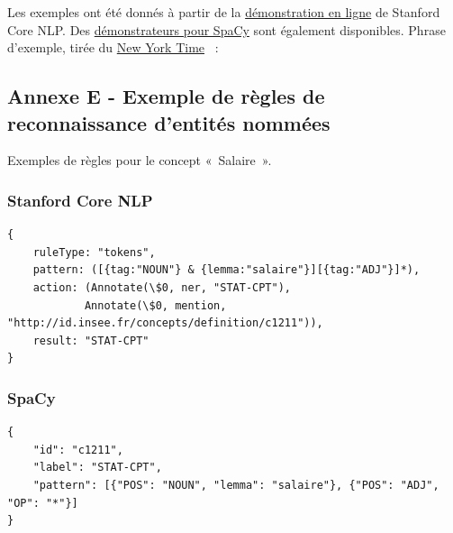 Les exemples ont été donnés à partir de la \href{http://corenlp.run/}{démonstration en ligne} \cite{corenlp-demo} de Stanford Core NLP. Des \href{https://explosion.ai/demos/}{démonstrateurs pour SpaCy} \cite{spacy-demo} sont également disponibles.
Phrase d'exemple, tirée du \href{https://www.nytimes.com/2019/08/26/world/europe/g7-live-updates.html?action=click&module=Top\%20Stories&pgtype=Homepage}{New York Time} \cite{sent-ex}~:
\newpage

\subsection*{Annexe E - Exemple de règles de reconnaissance d'entités nommées}

Exemples de règles pour le concept «~Salaire~».
\subsubsection*{Stanford Core NLP}
\begin{lstlisting}
{ 
    ruleType: "tokens", 
    pattern: ([{tag:"NOUN"} & {lemma:"salaire"}][{tag:"ADJ"}]*), 
    action: (Annotate(\$0, ner, "STAT-CPT"), 
            Annotate(\$0, mention, "http://id.insee.fr/concepts/definition/c1211")), 
    result: "STAT-CPT"
}
\end{lstlisting}

\subsubsection*{SpaCy}
\begin{lstlisting}
{ 
    "id": "c1211", 
    "label": "STAT-CPT", 
    "pattern": [{"POS": "NOUN", "lemma": "salaire"}, {"POS": "ADJ", "OP": "*"}] 
}
\end{lstlisting}

\label{rule-exemple}
